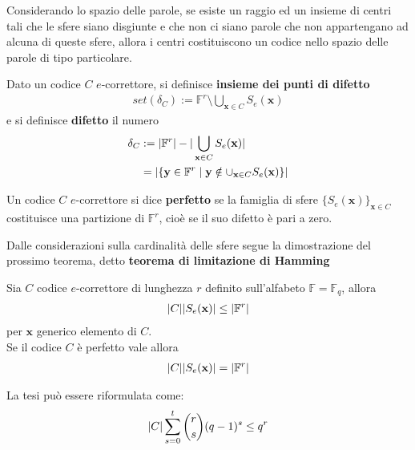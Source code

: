 Considerando lo spazio delle parole, se esiste un raggio ed un insieme di centri tali che le sfere siano disgiunte e che non ci siano parole che non appartengano ad alcuna di queste sfere, allora i centri costituiscono un codice nello spazio delle parole di tipo particolare.
\begin{definizione}
   Dato un codice $C$ $e$-correttore, si definisce {\bf insieme dei punti di difetto}
   \begin{align*}
      set(\delta_{C}) 
      :=  \mathbb{F}^{r} \setminus  \bigcup_{\mathbf{x} \in C} S_{e}(\mathbf{x})
   \end{align*}
   e si definisce {\bf difetto} il numero
   \begin{align*}
      \delta_{C} 
      &:= \arrowvert \mathbb{F}^{r} \arrowvert - \arrowvert \bigcup_{\mathbf{x} \in C} S_{e}(\mathbf{x}) \arrowvert \\
      &= \arrowvert \lbrace \mathbf{y} \in \mathbb{F}^{r} \mid \mathbf{y} \notin \cup_{\mathbf{x} \in C} S_{e}(\mathbf{x}) \rbrace \arrowvert
   \end{align*}
\end{definizione}
\begin{definizione}
   Un codice $C$ $e$-correttore si dice {\bf perfetto} se la famiglia di sfere  $\lbrace S_{e}(\mathbf{x}) \rbrace_{\mathbf{x} \in C} $ costituisce una partizione di $\mathbb{F}^{r}$, cioè se il suo difetto è pari a zero.
\end{definizione}
\noindent
Dalle considerazioni sulla cardinalità delle sfere segue la dimostrazione del prossimo teorema, detto {\bf teorema di limitazione di Hamming}
\begin{teorema}\label{cap2_1:teolimhamming}
   Sia $C$ codice $e$-correttore di lunghezza $r$ definito sull'alfabeto $\mathbb{F}=\mathbb{F}_{q}$, allora
   \begin{align*}
      \arrowvert C \arrowvert  \arrowvert S_{e}(\mathbf{x})  \arrowvert  \leq \arrowvert \mathbb{F}^{r} \arrowvert
   \end{align*}
   per $\mathbf{x}$ generico elemento di $C$.\\
   Se il codice $C$ è perfetto vale allora
   \begin{align*}
      \arrowvert C \arrowvert  \arrowvert S_{e}(\mathbf{x})  \arrowvert  = \arrowvert \mathbb{F}^{r} \arrowvert
   \end{align*}
\end{teorema}
\noindent
La tesi può essere riformulata come:
\begin{align*}
   \arrowvert C \arrowvert  \sum_{s=0}^{t} \binom{r}{s}(q-1)^{s} \leq q^r
\end{align*}
